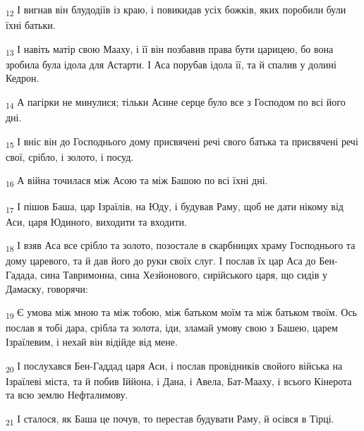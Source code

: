 \begin{tcolorbox}
\textsubscript{12} І вигнав він блудодіїв із краю, і повикидав усіх божків, яких поробили були їхні батьки.
\end{tcolorbox}
\begin{tcolorbox}
\textsubscript{13} І навіть матір свою Мааху, і її він позбавив права бути царицею, бо вона зробила була ідола для Астарти. І Аса порубав ідола її, та й спалив у долині Кедрон.
\end{tcolorbox}
\begin{tcolorbox}
\textsubscript{14} А пагірки не минулися; тільки Асине серце було все з Господом по всі його дні.
\end{tcolorbox}
\begin{tcolorbox}
\textsubscript{15} І вніс він до Господнього дому присвячені речі свого батька та присвячені речі свої, срібло, і золото, і посуд.
\end{tcolorbox}
\begin{tcolorbox}
\textsubscript{16} А війна точилася між Асою та між Башою по всі їхні дні.
\end{tcolorbox}
\begin{tcolorbox}
\textsubscript{17} І пішов Баша, цар Ізраїлів, на Юду, і будував Раму, щоб не дати нікому від Аси, царя Юдиного, виходити та входити.
\end{tcolorbox}
\begin{tcolorbox}
\textsubscript{18} І взяв Аса все срібло та золото, позостале в скарбницях храму Господнього та дому царевого, та й дав його до руки своїх слуг. І послав їх цар Аса до Бен-Гадада, сина Тавримонна, сина Хезйонового, сирійського царя, що сидів у Дамаску, говорячи:
\end{tcolorbox}
\begin{tcolorbox}
\textsubscript{19} Є умова між мною та між тобою, між батьком моїм та між батьком твоїм. Ось послав я тобі дара, срібла та золота, іди, зламай умову свою з Башею, царем Ізраїлевим, і нехай він відійде від мене.
\end{tcolorbox}
\begin{tcolorbox}
\textsubscript{20} І послухався Бен-Гаддад царя Аси, і послав провідників свойого війська на Ізраїлеві міста, та й побив Іййона, і Дана, і Авела, Бат-Мааху, і всього Кінерота та всю землю Нефталимову.
\end{tcolorbox}
\begin{tcolorbox}
\textsubscript{21} І сталося, як Баша це почув, то перестав будувати Раму, й осівся в Тірці.
\end{tcolorbox}
